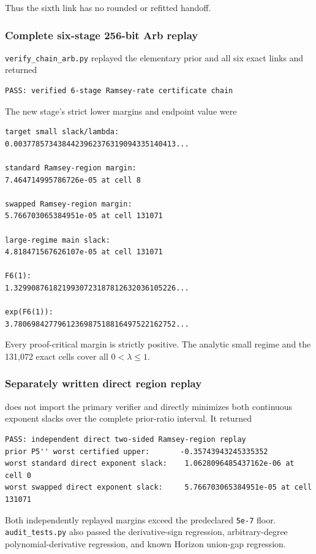 Thus the sixth link has no rounded or refitted handoff.

\subsubsection{Complete six-stage 256-bit Arb replay}

\texttt{verify\_chain\_arb.py} replayed the elementary prior and all six
exact links and returned

\begin{verbatim}
PASS: verified 6-stage Ramsey-rate certificate chain
\end{verbatim}

The new stage's strict lower margins and endpoint value were

\begin{verbatim}
target small slack/lambda:
0.0037785734384423962376319094335140413...

standard Ramsey-region margin:
7.464714995786726e-05 at cell 8

swapped Ramsey-region margin:
5.766703065384951e-05 at cell 131071

large-regime main slack:
4.818471567626107e-05 at cell 131071

F6(1):
1.3299087618219930723187812632036105226...

exp(F6(1)):
3.7806984277961236987518816497522162752...
\end{verbatim}

Every proof-critical margin is strictly positive. The analytic small
regime and the 131,072 exact cells cover all \(0<\lambda\leq1\).

\subsubsection{Separately written direct region replay}

 does not import the primary
verifier and directly minimizes both continuous exponent slacks over the
complete prior-ratio interval. It returned

\begin{verbatim}
PASS: independent direct two-sided Ramsey-region replay
prior P5'' worst certified upper:       -0.35743943245335352
worst standard direct exponent slack:    1.0628096485437162e-06 at cell 0
worst swapped direct exponent slack:     5.766703065384951e-05 at cell 131071
\end{verbatim}

Both independently replayed margins exceed the predeclared \texttt{5e-7}
floor. \texttt{audit\_tests.py} also passed the derivative-sign
regression, arbitrary-degree polynomial-derivative regression, and known
Horizon union-gap regression.

